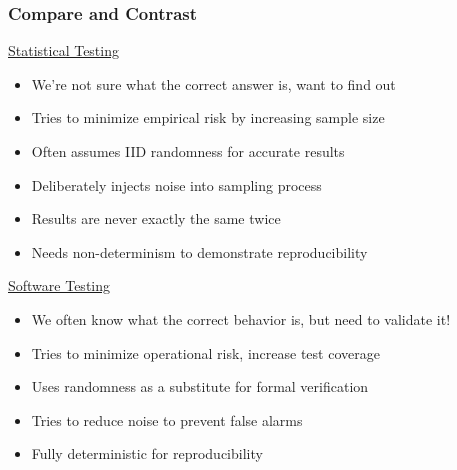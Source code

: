 \documentclass{beamer}
\begin{document}
\begin{frame}
\frametitle{Compare and Contrast}
\begin{multicols}{2}
\underline{Statistical Testing}
\begin{itemize}
\item We're not sure what the correct answer is, want to find out
\item Tries to minimize empirical risk by increasing sample size
\item Often assumes IID randomness for accurate results
\item Deliberately injects noise into sampling process
\item Results are never exactly the same twice
\item Needs non-determinism to demonstrate reproducibility
\end{itemize}
\vfill\null
\columnbreak
\underline{Software Testing}
\begin{itemize}
\item We often know what the correct behavior is, but need to validate it!
\item Tries to minimize operational risk, increase test coverage
\item Uses randomness as a substitute for formal verification
\item Tries to reduce noise to prevent false alarms
\item Fully deterministic for reproducibility
\end{itemize}
\end{multicols}
\end{frame}
\end{document}

